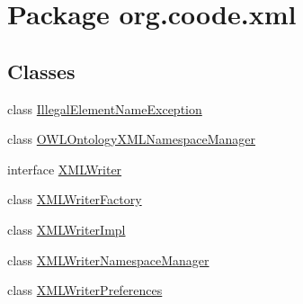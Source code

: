\hypertarget{namespaceorg_1_1coode_1_1xml}{\section{Package org.\-coode.\-xml}
\label{namespaceorg_1_1coode_1_1xml}
}
\subsection*{Classes}
\begin{DoxyCompactItemize}
\item 
class \hyperlink{classorg_1_1coode_1_1xml_1_1_illegal_element_name_exception}{Illegal\-Element\-Name\-Exception}
\item 
class \hyperlink{classorg_1_1coode_1_1xml_1_1_o_w_l_ontology_x_m_l_namespace_manager}{O\-W\-L\-Ontology\-X\-M\-L\-Namespace\-Manager}
\item 
interface \hyperlink{interfaceorg_1_1coode_1_1xml_1_1_x_m_l_writer}{X\-M\-L\-Writer}
\item 
class \hyperlink{classorg_1_1coode_1_1xml_1_1_x_m_l_writer_factory}{X\-M\-L\-Writer\-Factory}
\item 
class \hyperlink{classorg_1_1coode_1_1xml_1_1_x_m_l_writer_impl}{X\-M\-L\-Writer\-Impl}
\item 
class \hyperlink{classorg_1_1coode_1_1xml_1_1_x_m_l_writer_namespace_manager}{X\-M\-L\-Writer\-Namespace\-Manager}
\item 
class \hyperlink{classorg_1_1coode_1_1xml_1_1_x_m_l_writer_preferences}{X\-M\-L\-Writer\-Preferences}
\end{DoxyCompactItemize}
